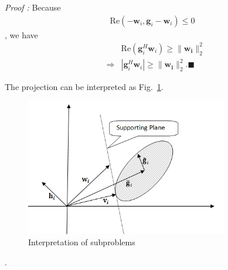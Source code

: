 \documentclass[conference]{IEEEtran}
\begin{document}
\emph{Proof :} 
Because
\begin{eqnarray}
\mathrm{Re}(-\mathbf{w}_i, \mathbf{g}_i - \mathbf{w}_i) \leq 0
\end{eqnarray},
we have
\begin{eqnarray}
&&\mathrm{Re}(\mathbf{g}_i^H\mathbf{w}_i) \geq \|\mathbf{w_i}\|_2^2\\
&\Rightarrow&|\mathbf{g}_i^H\mathbf{w}_i| \geq\|\mathbf{w_i}\|_2^2. \blacksquare
\end{eqnarray}


The projection can be interpreted as Fig.~\ref{fig:projection}.
\begin{figure}[ht]
	\centering
	\includegraphics[width=8.8cm]{projection.png} %
	\caption{Interpretation of subproblems}
	\label{fig:projection}
\end{figure}.
\end{document}
